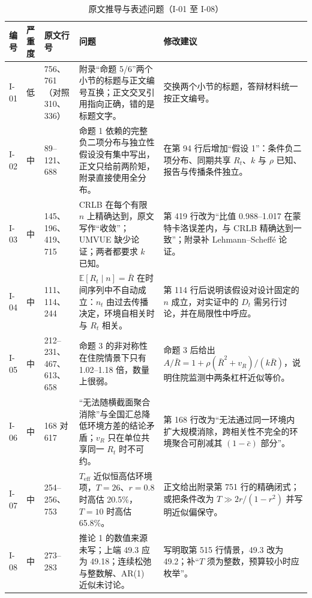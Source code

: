 \begin{table}[!tbp]
\centering
\footnotesize
\caption{原文推导与表述问题（I-01 至 I-08）}
\label{tab:ck-issues-a}
\setlength{\tabcolsep}{3pt}
\begin{tabular}{L{0.9cm}L{0.8cm}L{1.9cm}L{5.6cm}L{5.8cm}}
\toprule
编号 & 严重度 & 原文行号 & 问题 & 修改建议 \\
\midrule
I-01 & 低 & 756、761（对照 310、336） & 附录“命题 5/6”两个小节的标题与正文编号互换；正文交叉引用指向正确，错的是标题文字。 & 交换两个小节的标题，答辩材料统一按正文编号。 \\
I-02 & 中 & 89--121、688 & 命题 1 依赖的完整负二项分布与独立性假设没有集中写出，正文只给前两阶矩，附录直接使用全分布。 & 在第 94 行后增加“假设 1”：条件负二项分布、同期共享 $R_t$、$k$ 与 $\rho$ 已知、报告与传播条件独立。 \\
I-03 & 中 & 145、196、419、715 & CRLB 在每个有限 $n$ 上精确达到，原文写作“收敛”；UMVUE 缺少论证；两者都要求 $k$ 已知。 & 第 419 行改为“比值 0.988--1.017 在蒙特卡洛误差内，与 CRLB 精确达到一致”；附录补 Lehmann--Scheffé 论证。 \\
I-04 & 中 & 111、114、244 & $\mathbb{E}[R_t\mid n]=\bar R$ 在时间序列中不自动成立：$n_t$ 由过去传播决定，环境自相关时与 $R_t$ 相关。 & 第 114 行后说明该假设对设计固定的 $n$ 成立，对实证中的 $D_t$ 需另行讨论，并在局限性中呼应。 \\
I-05 & 中 & 212--231、467、613、658 & 命题 3 的非对称性在住院情景下只有 1.02--1.18 倍，数量上很弱。 & 命题 3 后给出 $A/\bar R=1+\rho(\bar R^2+v_R)/(k\bar R)$，说明住院监测中两条杠杆近似等价。 \\
I-06 & 中 & 168 对 617 & “无法随横截面聚合消除”与全国汇总降低环境方差的结论矛盾；$v_R$ 只在单位共享同一 $R_t$ 时不可约。 & 第 168 行改为“无法通过同一环境内扩大规模消除，跨相关性不完全的环境聚合可削减其 $(1-\bar c)$ 部分”。 \\
I-07 & 中 & 254--256、753 & $T_{\mathrm{eff}}$ 近似恒高估环境项，$T=26$、$r=0.8$ 时高估 20.5\%，$T=10$ 时高估 65.8\%。 & 正文给出附录第 751 行的精确闭式；或把条件改为 $T\gg2r/(1-r^2)$ 并写明近似偏保守。 \\
I-08 & 中 & 273--283 & 推论 1 的数值来源未写；上端 49.3 应为 49.18；连续松弛与整数解、AR(1) 近似未讨论。 & 写明取第 515 行情景，49.3 改为 49.2；补“$T$ 须为整数，预算较小时应枚举”。 \\
\bottomrule
\end{tabular}
\end{table}

